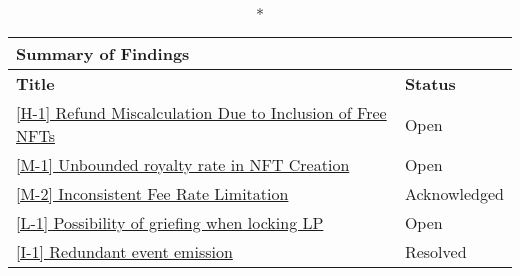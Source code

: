 \begin{longtable}{p{12.5cm}p{2.5cm}}
  \caption*{\textbf{Summary of Findings}} \\
  \toprule
  \textbf{Title} & \textbf{Status} \\   
  \midrule
  \endhead %
\rowcolor{lightgray}\hyperlink{h-1-refund-miscalculation-due-to-inclusion-of-free-nfts}{[H-1] Refund Miscalculation Due to Inclusion of Free NFTs} & Open \\
\hyperlink{m-1-unbounded-royalty-rate-in-nft-creation}{[M-1] Unbounded royalty rate in NFT Creation} & Open \\
\rowcolor{lightgray}\hyperlink{m-2-inconsistent-fee-rate-limitation}{[M-2] Inconsistent Fee Rate Limitation} & Acknowledged \\
\hyperlink{l-1-possibility-of-griefing-when-locking-lp}{[L-1] Possibility of griefing when locking LP} & Open \\
\rowcolor{lightgray}\hyperlink{i-1-redundant-event-emission}{[I-1] Redundant event emission} & Resolved \\

\bottomrule
\end{longtable}
